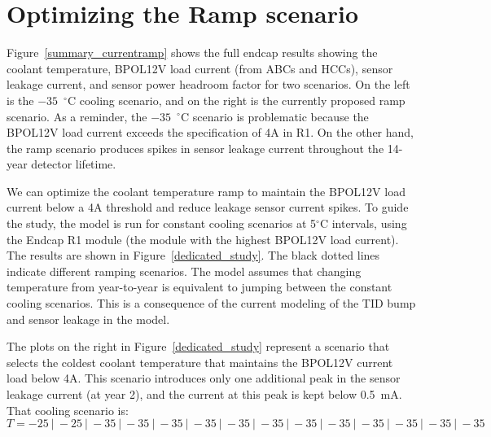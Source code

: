 
\section{Optimizing the Ramp scenario}

Figure~\ref{summary_currentramp} shows the full endcap results showing the coolant temperature,
BPOL12V load current (from ABCs and HCCs), sensor leakage current, and sensor power headroom factor
for two scenarios. On the left is the $-35$~$^{\circ}$C cooling scenario, and on the right is the
currently proposed ramp scenario. As a reminder, the $-35$~$^{\circ}$C scenario is problematic because
the BPOL12V load current exceeds the specification of 4A in R1. On the other hand, the ramp scenario
produces spikes in sensor leakage current throughout the 14-year detector lifetime.

We can optimize the coolant temperature ramp to maintain the BPOL12V load current below a 4A threshold
and reduce leakage sensor current spikes. To guide the study, the model is run for constant cooling
scenarios at 5$^{\circ}$C
intervals, using the Endcap R1 module (the module with the highest BPOL12V load current). 
The results are shown in Figure~\ref{dedicated_study}. The black
dotted lines indicate different ramping scenarios. The model assumes that changing temperature from
year-to-year is equivalent to jumping between the constant cooling scenarios. This is a consequence of
the current modeling of the TID bump and sensor leakage in the model.

The plots on the right in Figure~\ref{dedicated_study} represent a scenario that selects the coldest
coolant temperature that maintains the BPOL12V current load below 4A. This scenario introduces only
one additional peak in the sensor leakage current (at year 2), and the current at this peak is kept
below 0.5~mA. That cooling scenario is:
\begin{equation}
T = {-}25~|~{-}25~|~{-}35~|~{-}35~|~{-}35~|~{-}35~|~{-}35~|~{-}35~|~{-}35~|~{-}35~|~{-}35~|~{-}35~|~{-}35~|~{-}35
\label{eq:proposal1}
\end{equation}

